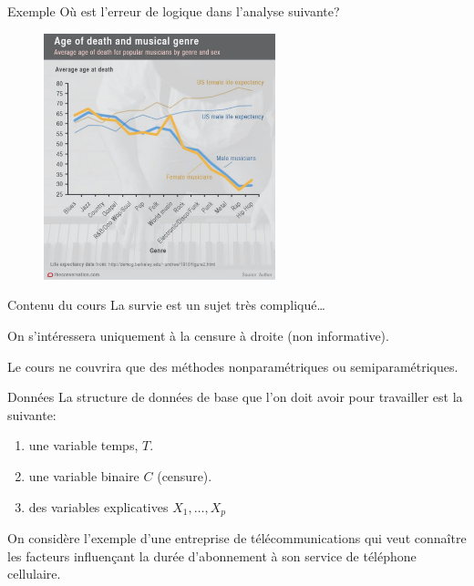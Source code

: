 \documentclass[
  ignorenonframetext,
]{beamer}
\providecommand{\tightlist}{%
  \setlength{\itemsep}{0pt}\setlength{\parskip}{0pt}}\usepackage{longtable,booktabs,array}
\begin{document}
\begin{frame}{Exemple}
\protect\hypertarget{exemple}{}
Où est l'erreur de logique dans l'analyse suivante?

\begin{figure}

{\centering \includegraphics[width=0.6\textwidth,height=\textheight]{figures/rightcensoring_illustration-age_death_music_genre.jpg}

}

\end{figure}
\end{frame}

\begin{frame}{Contenu du cours}
\protect\hypertarget{contenu-du-cours}{}
La survie est un sujet très compliqué\ldots{}

On s'intéressera uniquement à la censure à droite (non informative).

Le cours ne couvrira que des méthodes nonparamétriques ou
semiparamétriques.
\end{frame}

\begin{frame}{Données}
\protect\hypertarget{donnuxe9es}{}
La structure de données de base que l'on doit avoir pour travailler est
la suivante:

\begin{enumerate}
\tightlist
\item
  une variable temps, \(T\).
\item
  une variable binaire \(C\) (censure).
\item
  des variables explicatives \(X_1, \ldots, X_p\)
\end{enumerate}

On considère l'exemple d'une entreprise de télécommunications qui veut
connaître les facteurs influençant la durée d'abonnement à son service
de téléphone cellulaire.
\end{frame}
\end{document}
